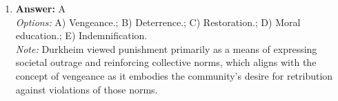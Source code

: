 \documentclass[12pt]{article}
\begin{document}
\begin{enumerate}[label=\arabic*.]
\\ \textit{Note:} The statement is incorrect, as the UK Constitution is not a direct copy of the US Constitution; rather, it is an uncodified constitution comprising statutes, conventions, and legal precedents that differ significantly in structure and principles from the codified US Constitution.
\item \textbf{Answer:} A
\\ \textit{Options:} A) Vengeance.; B) Deterrence.; C) Restoration.; D) Moral education.; E) Indemnification.
\\ \textit{Note:} Durkheim viewed punishment primarily as a means of expressing societal outrage and reinforcing collective norms, which aligns with the concept of vengeance as it embodies the community's desire for retribution against violations of those norms.
\end{enumerate}
\end{document}
